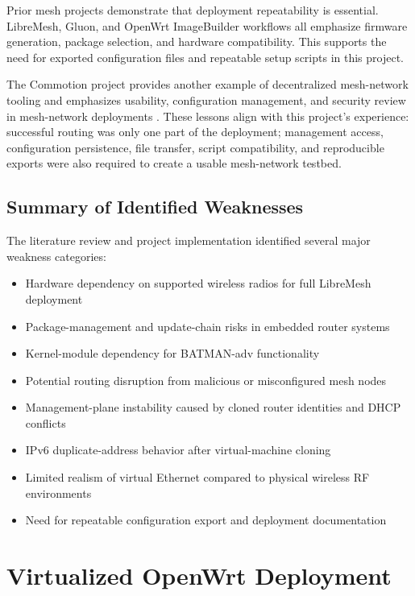 \documentclass[conference]{IEEEtran}
\begin{document}
Prior mesh projects demonstrate that deployment repeatability is essential. LibreMesh, Gluon, and OpenWrt ImageBuilder workflows all emphasize firmware generation, package selection, and hardware compatibility. This supports the need for exported configuration files and repeatable setup scripts in this project.

The Commotion project provides another example of decentralized mesh-network tooling and emphasizes usability, configuration management, and security review in mesh-network deployments \cite{commotionaudit}. These lessons align with this project's experience: successful routing was only one part of the deployment; management access, configuration persistence, file transfer, script compatibility, and reproducible exports were also required to create a usable mesh-network testbed.

\subsection{Summary of Identified Weaknesses}

The literature review and project implementation identified several major weakness categories:

\begin{itemize}
    \item Hardware dependency on supported wireless radios for full LibreMesh deployment
    \item Package-management and update-chain risks in embedded router systems
    \item Kernel-module dependency for BATMAN-adv functionality
    \item Potential routing disruption from malicious or misconfigured mesh nodes
    \item Management-plane instability caused by cloned router identities and DHCP conflicts
    \item IPv6 duplicate-address behavior after virtual-machine cloning
    \item Limited realism of virtual Ethernet compared to physical wireless RF environments
    \item Need for repeatable configuration export and deployment documentation
\end{itemize}

\section{Virtualized OpenWrt Deployment}
\end{document}
